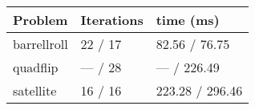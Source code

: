 \begin{tabular}{lll}
\toprule 
Problem & Iterations & time (ms) \\
\midrule 
barrellroll & 22 / 17 & 82.56 / 76.75 \\
quadflip & — / 28 & — / 226.49 \\
satellite & 16 / 16 & 223.28 / 296.46 \\
\bottomrule 
\end{tabular}
